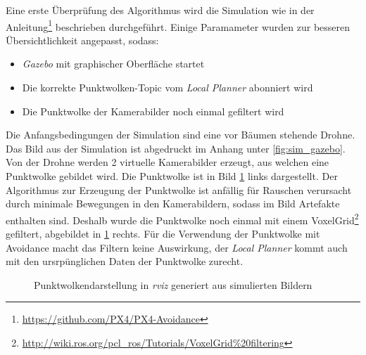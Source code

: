 Eine erste Überprüfung des Algorithmus wird die Simulation wie in der Anleitung\footnote{\url{https://github.com/PX4/PX4-Avoidance}\cite{dronecodestiftungObstacleDetectionAvoidance2023}} beschrieben durchgeführt. Einige Paramameter wurden zur besseren Übersichtlichkeit angepasst, sodass:
\begin{itemize}
    \item \textit{Gazebo} mit graphischer Oberfläche startet
    \item Die korrekte Punktwolken-Topic vom \textit{Local Planner} abonniert wird
    \item Die Punktwolke der Kamerabilder noch einmal gefiltert wird
\end{itemize} 

Die Anfangsbedingungen der Simulation sind eine vor Bäumen stehende Drohne. Das Bild aus der Simulation ist abgedruckt im Anhang unter \ref{fig:sim_gazebo}. Von der Drohne werden 2 virtuelle Kamerabilder erzeugt, aus welchen eine Punktwolke gebildet wird. Die Punktwolke ist in Bild \ref{fig:sim_gazebo_stereo} links dargestellt. Der Algorithmus zur Erzeugung der Punktwolke ist anfällig für Rauschen verursacht durch minimale Bewegungen in den Kamerabildern, sodass im Bild Artefakte enthalten sind. Deshalb wurde die Punktwolke noch einmal mit einem VoxelGrid\footnote{\url{http://wiki.ros.org/pcl_ros/Tutorials/VoxelGrid\%20filtering}\cite{openroboticsDocumentationROSWiki}} gefiltert, abgebildet in \ref{fig:sim_gazebo_stereo} rechts. Für die Verwendung der Punktwolke mit Avoidance macht das Filtern keine Auswirkung, der \textit{Local Planner} kommt auch mit den ursrpünglichen Daten der Punktwolke zurecht.

\begin{figure}[!h]
    \centering
    \hfill
    \hfill
    \caption[Punktwolkendarstellung in \textit{rviz}]{Punktwolkendarstellung in \textit{rviz} generiert aus simulierten Bildern}
    \label{fig:sim_gazebo_stereo}
\end{figure}

